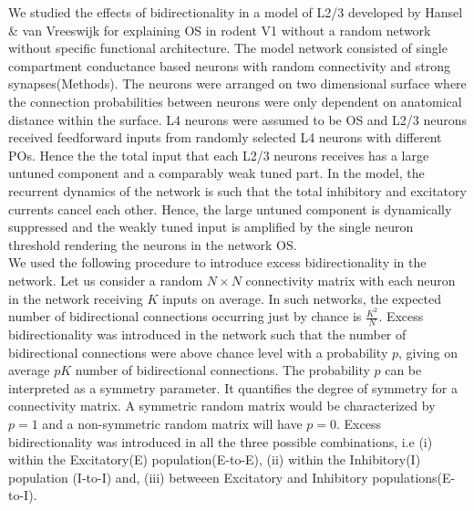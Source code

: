 We studied the effects of bidirectionality in a model of L2/3 developed by Hansel \& van Vreeswijk\cite{Hansel2012} for explaining OS in rodent V1 without a random network without specific functional architecture. The model network consisted of single compartment conductance based neurons with random connectivity and strong synapses(Methods). The neurons were arranged on two dimensional surface where the connection probabilities between neurons were only dependent on anatomical distance within the surface. L4 neurons were assumed to be OS and L2/3 neurons received feedforward inputs from randomly selected L4 neurons with different POs. Hence the the total input that each L2/3 neurons receives has a large untuned component and a comparably weak tuned part. In the model, the recurrent dynamics of the network is such that the total inhibitory and excitatory currents cancel each other. Hence, the large untuned component is dynamically suppressed and the weakly tuned input is amplified by the single neuron threshold rendering the neurons in the network OS. \\
We used the following procedure to introduce excess bidirectionality in the network. Let us consider a random $N \times N$ connectivity matrix with each neuron in the network receiving $K$ inputs on average. In such networks, the expected number of bidirectional connections occurring just by chance is $\frac{K^2}{N}$. Excess bidirectionality was introduced in the network such that the number of bidirectional connections were above chance level with a probability $p$, giving on average $pK$ number of bidirectional connections. The probability $p$ can be interpreted as a symmetry parameter. It quantifies the degree of symmetry for a connectivity matrix. A symmetric random matrix would be characterized by $p = 1$ and a non-symmetric random matrix will have $p = 0$. %
Excess bidirectionality was introduced in all the three possible combinations, i.e (i) within the Excitatory(E) population(E-to-E), (ii) within the Inhibitory(I) population (I-to-I) and, (iii) betweeen Excitatory and Inhibitory populations(E-to-I). \\

